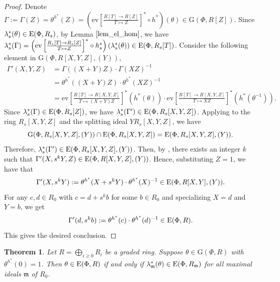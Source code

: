 \documentclass[11pt]{amsart}
\newtheorem{thm}{Theorem}[section]
\theoremstyle{definition}
\numberwithin{equation}{section}
\numberwithin{equation}{section}
\newcommand{\G}{\mathrm{G}}
\newcommand{\<}{\langle}
\renewcommand{\>}{\rangle}
\newcommand{\El}{{\operatorname{\rm E}}}
\newcommand{\ev}{\mathrm{ev}}
\begin{document}
\begin{proof}
   Denote $\Gamma:=\Gamma(Z)=\theta^{h^{\ast}}(Z)=\left(\ev\left [\frac{R[T]\to R[Z]}{T\mapsto Z}\right ]^{\ast}\circ h^{\ast}\right)(\theta)\in \G(\Phi,R[Z])$. Since $\lambda^{\ast}_{s}(\theta)\in\El(\Phi,R_{s})$, by Lemma $\ref{lem_el_hom}$, we have $\lambda^{\ast}_{s}(\Gamma)=\left(\ev\left [\frac{R_s[T]\to R_s[Z]}{T\mapsto Z}\right ]^{\ast}\circ h_s^{\ast}\right)(\lambda^{\ast}_{s}(\theta))\in\El(\Phi,R_{s}[T])$. Consider the following element in $\G(\Phi,R[X,Y,Z],(Y))$, 
    \[\begin{split}
    \Gamma'(X,Y,Z)&=\Gamma((X+Y)Z)\cdot\Gamma(XZ)^{-1}\\&=\theta^{h^{\ast}}((X+Y)Z)\cdot\theta^{h^{\ast}}(XZ)^{-1}\\&=\ev\left [\frac{R[T]\to R[X,Y,Z]}{T\mapsto (X+Y)Z}\right ]^{\ast}(h^{\ast}(\theta))\cdot\ev\left [\frac{R[T]\to R[X,Y,Z]}{T\mapsto XZ}\right ]^{\ast}(h^{\ast}(\theta^{-1})).
     \end{split}\] 
     Since $\lambda^{\ast}_{s}(\Gamma)\in\El(\Phi,R_{s}[Z])$, we have $\lambda^{\ast}_{s}(\Gamma')\in\El(\Phi,R_{s}[X,Y,Z])$. Applying \cite[Lemma 1.4]{ApSt13} to the ring $R_{s}[X,Y,Z]$ and the splitting ideal $YR_{s}[X,Y,Z]$, we have \[\G(\Phi,R_{s}[X,Y,Z],(Y))\cap\El(\Phi,R_{s}[X,Y,Z])=\El(\Phi,R_{s}[X,Y,Z],(Y)).\] Therefore, $\lambda^{\ast}_{s}(\Gamma')\in\El(\Phi,R_{s}[X,Y,Z],(Y))$. Then, by \cite[Theorem 6.3]{ApSt13}, there exists an integer $k$ such that $\Gamma'(X,s^{k}Y,Z)\in\El(\Phi,R[X,Y,Z],(Y))$. Hence, substituting $Z=1$, we have that \[\Gamma'(X,s^{k}Y):=\theta^{h^{\ast}}(X+s^{k}Y)\cdot\theta^{h^{\ast}}(X)^{-1}\in\El(\Phi,R[X,Y],(Y)).\] 
   For any $c,d\in R_{0}$ with $c=d+s^{k}b$ for some $b\in R_{0}$ and specializing $X=d$ and $Y=b$, we get \[\Gamma'(d,s^{k}b):=\theta^{h^{\ast}}(c)\cdot\theta^{h^{\ast}}(d)^{-1}\in\El(\Phi,R).\] 
   This gives the desired conclusion.
\end{proof}
\begin{thm}\label{thm_lgp_chgp}
     Let $R=\bigoplus_{i\geq 0}R_{i}$ be a graded ring. Suppose $\theta\in \G(\Phi,R)$ with $\theta^{h^{\ast}}(0)=1$. Then $\theta\in \El(\Phi,R)$ if and only if $\lambda^{\ast}_{\mathfrak{m}}(\theta)\in \El(\Phi,R_{\mathfrak{m}})$ for all maximal ideals $\mathfrak{m}$ of $R_{0}$.
\end{thm}
\end{document}
